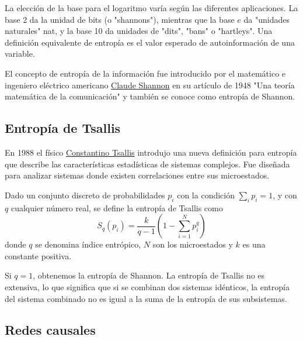 La elección de la base para el logaritmo varía según las diferentes 
aplicaciones. La base 2 da la unidad de bits (o "shannons"), mientras que la base $e$ da "unidades naturales" 
nat, y la base 10 da unidades de "dits", "bans" o "hartleys". Una definición equivalente de entropía es 
el valor esperado de autoinformación de una variable.

El concepto de entropía de la información fue introducido por el matemático e ingeniero eléctrico americano 
\href{https://en.wikipedia.org/wiki/Claude_Shannon}{Claude Shannon} en su artículo 
de 1948 "Una teoría matemática de la comunicación"\cite{shannon-1948} y también se conoce como entropía de Shannon.


\subsection{Entropía de Tsallis}
En 1988 el físico \href{https://en.wikipedia.org/wiki/Constantino_Tsallis}{Constantino Tsallis} 
introdujo una nueva definición para entropía que describe las características estadísticas de sistemas 
complejos. Fue diseñada para analizar sistemas donde existen correlaciones entre sus microestados\cite{tsallis}.
\begin{definicion}\label{def:tsallis_entropy}
Dado un conjunto discreto de probabilidades ${p_i}$ con la condición $\sum_{i} p_i = 1$, y con $q$ 
cualquier número real, se define la entropía de Tsallis como
$$ S_q(p_i)=\frac{k}{q-1}(1- \sum_{i=1}^{N}p_{i}^{q})$$
donde $q$ se denomina índice entrópico, $N$ son los microestados y $k$ es una constante positiva.
\end{definicion}
Si $q = 1$, obtenemos la entropía de 
Shannon. La entropía de Tsallis no es extensiva, lo que significa que si se combinan dos sistemas idénticos, 
la entropía del sistema combinado no es igual a la suma de la entropía de sus subsistemas\cite{comparison-entropies}.

\subsection{Redes causales}

